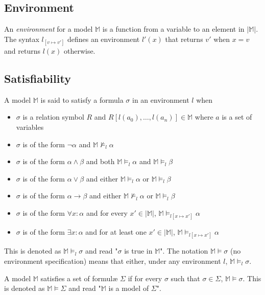 	\subsection{Environment}

		An \emph{environment} for a model $\mathbb{M}$ is a function from a
		variable to an element in $|\mathbb{M}|$. The syntax $l_{[v \mapsto
		v']}$ defines an environment $l'(x)$ that returns $v'$ when $x=v$ and
		returns $l(x)$ otherwise.

	\subsection{Satisfiability}

		A model $\mathbb{M}$ is said to satisfy a formula $\sigma$ in an
		environment $l$ when
		\begin{itemize}
		\item $\sigma$ is a relation symbol $R$ and $R[l(a_0) , \ldots , l(a_n)] \in \mathbb{M}$ where $a$ is a set of variables
		\item $\sigma$ is of the form $\neg\alpha$ and $\mathbb{M} \not\models_l \alpha$
		\item $\sigma$ is of the form $\alpha\wedge\beta$ and both $\mathbb{M} \models_l \alpha$ and $\mathbb{M} \models_l \beta$
		\item $\sigma$ is of the form $\alpha\vee\beta$ and either $\mathbb{M} \models_l \alpha$ or $\mathbb{M} \models_l \beta$
		\item $\sigma$ is of the form $\alpha\to\beta$ and either $\mathbb{M} \not\models_l \alpha$ or $\mathbb{M} \models_l \beta$
		\item $\sigma$ is of the form $\forall x : \alpha$  and for every $x' \in |\mathbb{M}|$, $\mathbb{M} \models_{l[x \mapsto x']} \alpha$
		\item $\sigma$ is of the form $\exists x : \alpha$  and for at least one $x' \in |\mathbb{M}|$, $\mathbb{M} \models_{l[x \mapsto x']} \alpha$
		\end{itemize}
		This is denoted as $\mathbb{M} \models_l \sigma$ and read "$\sigma$ is
		true in $\mathbb{M}$". The notation $\mathbb{M} \models \sigma$ (no
		environment specification) means that either, under any environment
		$l$, $\mathbb{M} \models_l \sigma$.

		A model $\mathbb{M}$ satisfies a set of formul{\ae} $\Sigma$ if for every
		$\sigma$ such that $\sigma \in \Sigma$, $\mathbb{M} \models \sigma$.
		This is denoted as $\mathbb{M} \models \Sigma$ and read "$\mathbb{M}$
		is a model of $\Sigma$".

